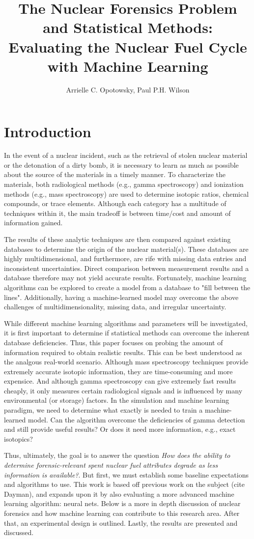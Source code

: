 \documentclass{anstrans}
\title{%
The Nuclear Forensics Problem and Statistical Methods: \\
Evaluating the Nuclear Fuel Cycle with Machine Learning
}
\author{Arrielle C. Opotowsky, Paul P.H. Wilson}
\institute{
Computational Nuclear Engineering Research Group \\
University of Wisconsin at Madison
}
\begin{document}
\section{Introduction}

In the event of a nuclear incident, such as the retrieval of stolen nuclear
material or the detonation of a dirty bomb, it is necessary to learn as much as
possible about the source of the materials in a timely manner. To characterize
the materials, both radiological methods (e.g., gamma spectroscopy) and
ionization methods (e.g., mass spectroscopy) are used to determine isotopic
ratios, chemical compounds, or trace elements. Although each category has a
multitude of techniques within it, the main tradeoff is between time/cost and
amount of information gained. 

The results of these analytic techniques are then compared against existing
databases to determine the origin of the nuclear material(s). These databases
are highly multidimensional, and furthermore, are rife with missing data
entries and inconsistent uncertainties. Direct comparison between measurement
results and a database therefore may not yield accurate results. Fortunately,
machine learning algorithms can be explored to create a model from a database
to "fill between the lines".  Additionally, having a machine-learned model may
overcome the above challenges of multidimensionality, missing data, and
irregular uncertainty.

While different machine learning algorithms and parameters will be
investigated, it is first important to determine if statistical methods can
overcome the inherent database deficiencies. Thus, this paper focuses on
probing the amount of information required to obtain realistic results.  This
can be best understood as the analgous real-world scenario.  Although mass
spectroscopy techniques provide extremely accurate isotopic information, they
are time-consuming and more expensice. And although gamma spectroscopy can give
extremely fast results cheaply, it only measures certain radiological signals
and is influenced by many environmental (or storage) factors. In the simulation
and machine learning paradigm, we need to determine what exactly is needed to
train a machine-learned model. Can the algorithm overcome the deficiencies of
gamma detection and still provide useful results? Or does it need more
information, e.g., exact isotopics?

Thus, ultimately, the goal is to answer the question \textit{How does the
ability to determine forensic-relevant spent nuclear fuel attributes degrade as
less information is available?}. But first, we must establish some baseline
expectations and algorithms to use. This work is based off previous work on the
subject (cite Dayman), and expands upon it by also evaluating a more advanced
machine learning algorithm: neural nets. Below is a more in depth discussion of
nuclear forensics and how machine learning can contribute to this research
area. After that, an experimental design is outlined. Lastly, the results are
presented and discussed. 
\end{document}
